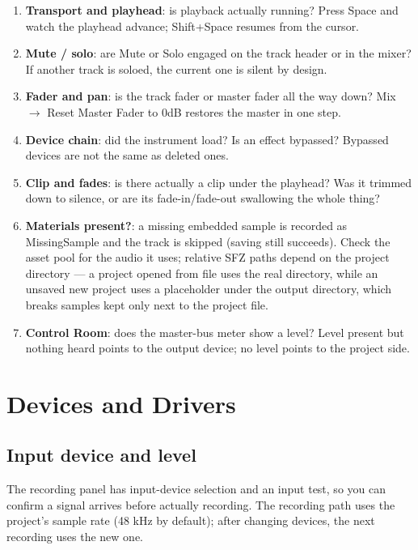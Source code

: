 \begin{enumerate}
  \item \textbf{Transport and playhead}: is playback actually running? Press Space and watch the playhead advance; Shift+Space resumes from the cursor.
  \item \textbf{Mute / solo}: are Mute or Solo engaged on the track header or in the mixer? If another track is soloed, the current one is silent by design.
  \item \textbf{Fader and pan}: is the track fader or master fader all the way down? Mix $\to$ Reset Master Fader to 0dB restores the master in one step.
  \item \textbf{Device chain}: did the instrument load? Is an effect bypassed? Bypassed devices are not the same as deleted ones.
  \item \textbf{Clip and fades}: is there actually a clip under the playhead? Was it trimmed down to silence, or are its fade-in/fade-out swallowing the whole thing?
  \item \textbf{Materials present?}: a missing embedded sample is recorded as MissingSample and the track is skipped (saving still succeeds). Check the asset pool for the audio it uses; relative SFZ paths depend on the project directory — a project opened from file uses the real directory, while an unsaved new project uses a placeholder under the output directory, which breaks samples kept only next to the project file.
  \item \textbf{Control Room}: does the master-bus meter show a level? Level present but nothing heard points to the output device; no level points to the project side.
\end{enumerate}


\section{Devices and Drivers}

\subsection{Input device and level}

The recording panel has input-device selection and an input test, so you can confirm a
signal arrives before actually recording. The recording path uses the project's sample
rate (48 kHz by default); after changing devices, the next recording uses the new one.

